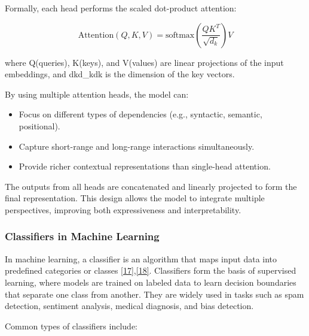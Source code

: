 \documentclass[12pt,oneside,openright,a4paper]{cpe-english-project}
\begin{document}
Formally, each head performs the scaled dot-product attention:

\[\text{Attention}(Q, K, V) = \text{softmax}\left(\frac{QK^T}{\sqrt{d_k}}\right)V\]

where Q(queries), K(keys), and V(values) are linear projections of the input embeddings, and dkd\_kdk is the dimension of the key vectors.

By using multiple attention heads, the model can:

\begin{itemize}
\item
  {Focus on different types of dependencies (e.g., syntactic, semantic, positional).}
\item
  {Capture short-range and long-range interactions simultaneously.}
\item
  {Provide richer contextual representations than single-head attention.}
\end{itemize}

The outputs from all heads are concatenated and linearly projected to form the final representation. This design allows the model to integrate multiple perspectives, improving both expressiveness and interpretability.

\subsubsection{Classifiers in Machine Learning}

In machine learning, a classifier is an algorithm that maps input data into predefined categories or classes \hyperlink{bib:ref17}{[17]},\hyperlink{bib:ref18}{[18]}. Classifiers form the basis of supervised learning, where models are trained on labeled data to learn decision boundaries that separate one class from another. They are widely used in tasks such as spam detection, sentiment analysis, medical diagnosis, and bias detection.

Common types of classifiers include:
\end{document}
